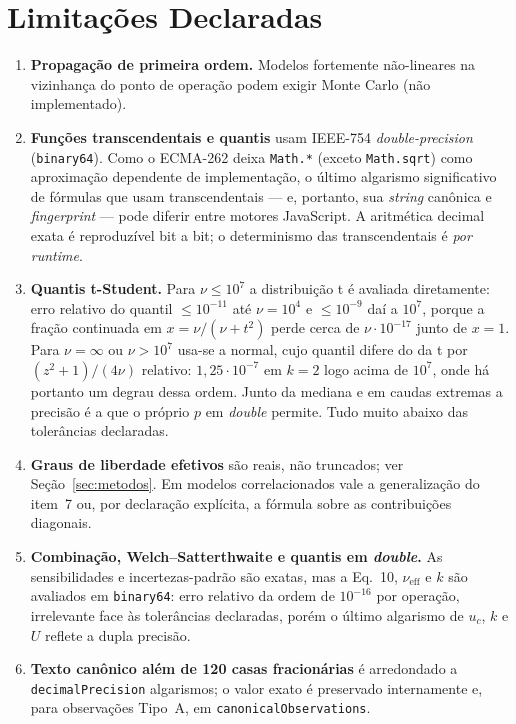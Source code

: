 \documentclass[11pt,a4paper]{article}
\begin{document}
\section{Limitações Declaradas}
\label{sec:limitacoes}

\begin{enumerate}
  \item \textbf{Propagação de primeira ordem.} Modelos fortemente não-lineares na vizinhança do ponto de operação podem exigir Monte Carlo (não implementado).
  \item \textbf{Funções transcendentais e quantis} usam IEEE-754 \emph{double-precision} (\texttt{binary64}). Como o ECMA-262 deixa \texttt{Math.*} (exceto \texttt{Math.sqrt}) como aproximação dependente de implementação, o último algarismo significativo de fórmulas que usam transcendentais --- e, portanto, sua \emph{string} canônica e \emph{fingerprint} --- pode diferir entre motores JavaScript. A aritmética decimal exata é reproduzível bit a bit; o determinismo das transcendentais é \emph{por runtime}.
  \item \textbf{Quantis t-Student.} Para \(\nu \leq 10^{7}\) a distribuição t é avaliada diretamente: erro relativo do quantil \(\leq 10^{-11}\) até \(\nu = 10^4\) e \(\leq 10^{-9}\) daí a \(10^7\), porque a fração continuada em \(x = \nu/(\nu + t^2)\) perde cerca de \(\nu \cdot 10^{-17}\) junto de \(x = 1\). Para \(\nu = \infty\) ou \(\nu > 10^{7}\) usa-se a normal, cujo quantil difere do da t por \((z^2 + 1)/(4\nu)\) relativo: \(1{,}25 \cdot 10^{-7}\) em \(k = 2\) logo acima de \(10^7\), onde há portanto um degrau dessa ordem. Junto da mediana e em caudas extremas a precisão é a que o próprio \(p\) em \emph{double} permite. Tudo muito abaixo das tolerâncias declaradas.
  \item \textbf{Graus de liberdade efetivos} são reais, não truncados; ver Seção~\ref{sec:metodos}. Em modelos correlacionados vale a generalização do item~7 ou, por declaração explícita, a fórmula sobre as contribuições diagonais.
  \item \textbf{Combinação, Welch--Satterthwaite e quantis em \emph{double}.} As sensibilidades e incertezas-padrão são exatas, mas a Eq.~10, \(\nu_{\text{eff}}\) e \(k\) são avaliados em \texttt{binary64}: erro relativo da ordem de \(10^{-16}\) por operação, irrelevante face às tolerâncias declaradas, porém o último algarismo de \(u_c\), \(k\) e \(U\) reflete a dupla precisão.
  \item \textbf{Texto canônico além de 120 casas fracionárias} é arredondado a \texttt{decimalPrecision} algarismos; o valor exato é preservado internamente e, para observações Tipo~A, em \texttt{canonicalObservations}.

\end{enumerate}
\end{document}
